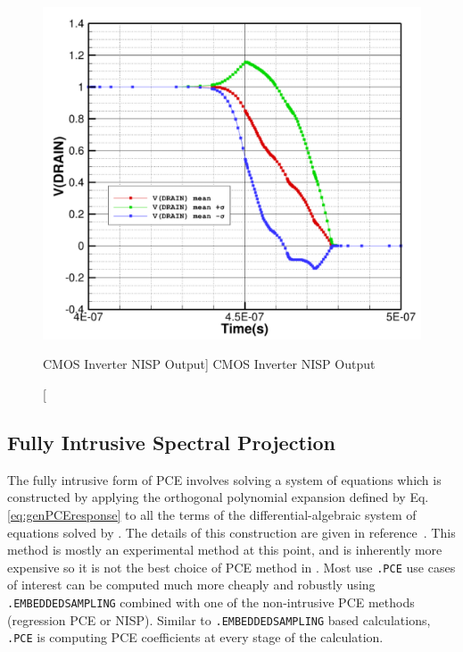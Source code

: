 \begin{figure}[hbt]
\centering
\includegraphics[width=5in]{cmos_inverter_result.pdf}
\caption
  [CMOS Inverter NISP Output] {CMOS Inverter NISP Output}
\label{NISP_result1}
\end{figure}

\clearpage
\subsection{Fully Intrusive Spectral Projection}
\label{intrusivePCE}
The fully intrusive form of PCE involves solving a system of equations which is constructed by 
applying the orthogonal polynomial expansion defined by 
Eq. \eqref{eq:genPCEresponse} to all the terms of the differential-algebraic 
system of equations solved by \Xyce{}.  The details of this construction are given in 
reference~\cite{xyceAdvancedUQ}.  This method is mostly an experimental method at this point, and is inherently more expensive
so it is not the best choice of PCE method in \Xyce{}.   Most use \texttt{.PCE} use cases of
interest can be computed much more cheaply and robustly using \texttt{.EMBEDDEDSAMPLING} 
combined with one of the non-intrusive PCE methods (regression PCE or NISP).
Similar to \texttt{.EMBEDDEDSAMPLING} based calculations, \texttt{.PCE} is computing 
PCE coefficients at every stage of the calculation.   

